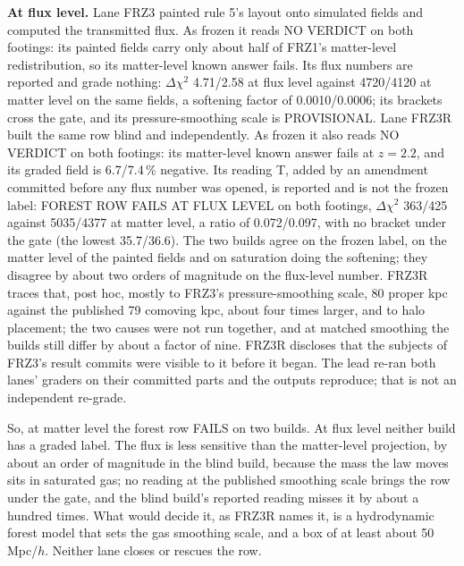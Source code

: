 \documentclass[10pt]{article}
\begin{document}
\textbf{At flux level.} Lane FRZ3 painted rule 5's layout onto simulated fields and computed the transmitted flux. As frozen it reads NO VERDICT on both footings: its painted fields carry only about half of FRZ1's matter-level redistribution, so its matter-level known answer fails. Its flux numbers are reported and grade nothing: $\Delta\chi^2$ 4.71/2.58 at flux level against 4720/4120 at matter level on the same fields, a softening factor of 0.0010/0.0006; its brackets cross the gate, and its pressure-smoothing scale is PROVISIONAL. Lane FRZ3R built the same row blind and independently. As frozen it also reads NO VERDICT on both footings: its matter-level known answer fails at $z=2.2$, and its graded field is 6.7/7.4\,\% negative. Its reading T, added by an amendment committed before any flux number was opened, is reported and is not the frozen label: FOREST ROW FAILS AT FLUX LEVEL on both footings, $\Delta\chi^2$ 363/425 against 5035/4377 at matter level, a ratio of 0.072/0.097, with no bracket under the gate (the lowest 35.7/36.6). The two builds agree on the frozen label, on the matter level of the painted fields and on saturation doing the softening; they disagree by about two orders of magnitude on the flux-level number. FRZ3R traces that, post hoc, mostly to FRZ3's pressure-smoothing scale, 80 proper kpc against the published 79 comoving kpc, about four times larger, and to halo placement; the two causes were not run together, and at matched smoothing the builds still differ by about a factor of nine. FRZ3R discloses that the subjects of FRZ3's result commits were visible to it before it began. The lead re-ran both lanes' graders on their committed parts and the outputs reproduce; that is not an independent re-grade.

So, at matter level the forest row FAILS on two builds. At flux level neither build has a graded label. The flux is less sensitive than the matter-level projection, by about an order of magnitude in the blind build, because the mass the law moves sits in saturated gas; no reading at the published smoothing scale brings the row under the gate, and the blind build's reported reading misses it by about a hundred times. What would decide it, as FRZ3R names it, is a hydrodynamic forest model that sets the gas smoothing scale, and a box of at least about 50\,Mpc/$h$. Neither lane closes or rescues the row.
\end{document}
